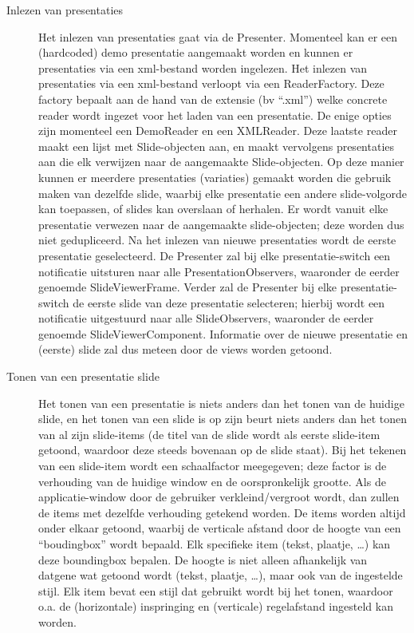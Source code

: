 \documentclass[a4paper]{article}
\begin{document}
\begin{description}
\item[Inlezen van presentaties]
Het inlezen van presentaties gaat via de Presenter. Momenteel kan er een (hardcoded) demo presentatie aangemaakt worden en kunnen er presentaties via een xml-bestand worden ingelezen. Het inlezen van presentaties via een xml-bestand verloopt via een ReaderFactory. Deze factory bepaalt aan de hand van de extensie (bv “.xml”) welke concrete reader wordt ingezet voor het laden van een presentatie. De enige opties zijn momenteel een DemoReader en een XMLReader. Deze laatste reader maakt een lijst met Slide-objecten aan, en maakt vervolgens presentaties aan die elk verwijzen naar de aangemaakte Slide-objecten. Op deze manier kunnen er meerdere presentaties (variaties) gemaakt worden die gebruik maken van dezelfde slide, waarbij elke presentatie een andere slide-volgorde kan toepassen, of slides kan overslaan of herhalen. Er wordt vanuit elke presentatie verwezen naar de aangemaakte slide-objecten; deze worden dus niet gedupliceerd.
Na het inlezen van nieuwe presentaties wordt de eerste presentatie geselecteerd. De Presenter zal bij elke presentatie-switch een notificatie uitsturen naar alle PresentationObservers, waaronder de eerder genoemde SlideViewerFrame. Verder zal de Presenter bij elke presentatie-switch de eerste slide van deze presentatie selecteren; hierbij wordt een notificatie uitgestuurd naar alle SlideObservers, waaronder de eerder genoemde SlideViewerComponent. Informatie over de nieuwe presentatie en (eerste) slide zal dus meteen door de views worden getoond.
\item[Tonen van een presentatie slide]
Het tonen van een presentatie is niets anders dan het tonen van de huidige slide, en het tonen van een slide is op zijn beurt niets anders dan het tonen van al zijn slide-items (de titel van de slide wordt als eerste slide-item getoond, waardoor deze steeds bovenaan op de slide staat). Bij het tekenen van een slide-item wordt een schaalfactor meegegeven; deze factor is de verhouding van de huidige window en de oorspronkelijk grootte. Als de applicatie-window door de gebruiker verkleind/vergroot wordt, dan zullen de items met dezelfde verhouding getekend worden.
De items worden altijd onder elkaar getoond, waarbij de verticale afstand door de hoogte van een “boudingbox” wordt bepaald. Elk specifieke item (tekst, plaatje, …) kan deze boundingbox bepalen. De hoogte is niet alleen afhankelijk van datgene wat getoond wordt (tekst, plaatje, …), maar ook van de ingestelde stijl. Elk item bevat een stijl dat gebruikt wordt bij het tonen, waardoor o.a. de (horizontale) inspringing en (verticale) regelafstand ingesteld kan worden.
\end{description}
\end{document}
